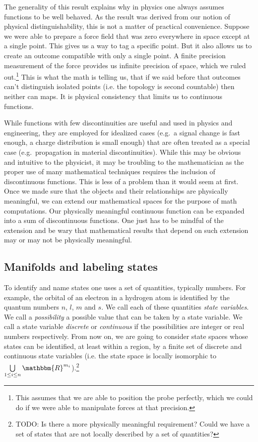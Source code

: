 \documentclass[aps,pra,10pt,twocolumn,floatfix,nofootinbib]{revtex4-1}
\numberwithin{equation}{section}
\theoremstyle{definition}
\begin{document}
The generality of this result explains why in physics one always assumes functions to be well behaved. As the result was derived from our notion of physical distinguishability, this is not a matter of practical convenience. Suppose we were able to prepare a force field that was zero everywhere in space except at a single point. This gives us a way to tag a specific point. But it also allows us to create an outcome compatible with only a single point. A finite precision measurement of the force provides us infinite precision of space, which we ruled out.\footnote{This assumes that we are able to position the probe perfectly, which we could do if we were able to manipulate forces at that precision.} This is what the math is telling us, that if we said before that outcomes can't distinguish isolated points (i.e. the topology is second countable) then neither can maps. It is physical consistency that limits us to continuous functions.

While functions with few discontinuities are useful and used in physics and engineering, they are employed for idealized cases  (e.g.~a signal change is fast enough, a charge distribution is small enough) that are often treated as a special case (e.g.~propagation in material discontinuities). While this may be obvious and intuitive to the physicist, it may be troubling to the mathematician as the proper use of many mathematical techniques requires the inclusion of discontinuous functions. This is less of a problem than it would seem at first. Once we made sure that the objects and their relationships are physically meaningful, we can extend our mathematical spaces for the purpose of math computations. Our physically meaningful continuous function can be expanded into a sum of discontinuous functions. One just has to be mindful of the extension and be wary that mathematical results that depend on such extension may or may not be physically meaningful.

\subsection{Manifolds and labeling states}

To identify and name states one uses a set of quantities, typically numbers. For example, the orbital of an electron in a hydrogen atom is identified by the quantum numbers $n$, $l$, $m$ and $s$. We call each of these quantities \emph{state variables}. We call a \emph{possibility} a possible value that can be taken by a state variable. We call a state variable \emph{discrete} or \emph{continuous} if the possibilities are integer or real numbers respectively. From now on, we are going to consider state spaces whose states can be identified, at least within a region, by a finite set of discrete and continuous state variables (i.e. the state space is locally isomorphic to $\bigcup\limits_{1 \leq i \leq n} \mathbbm{R}^{m_i}$).\footnote{TODO: Is there a more physically meaningful requirement? Could we have a set of states that are not locally described by a set of quantities?}
\end{document}
